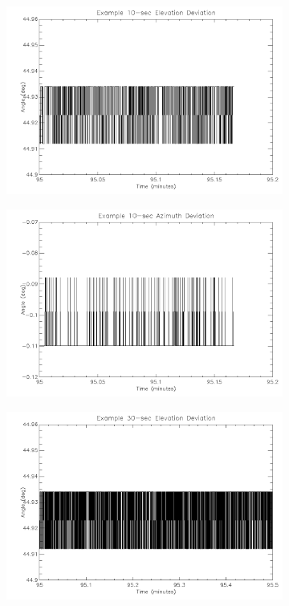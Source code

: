 \begin{figure}[htbp]
\begin{subfigure}{0.45\textwidth}
		\includegraphics[width=1\linewidth]{appendix/img/campaign_results/latealt10sec.png}
		\caption{}
		\label{fig:sub:latealt10}
	\end{subfigure}
	\begin{subfigure}{0.45\textwidth}
		\includegraphics[width=1\linewidth]{appendix/img/campaign_results/lateaz10sec.png}
		\caption{}
		\label{fig:sub:lateaz10}
	\end{subfigure}
	\begin{subfigure}{0.45\textwidth}
		\includegraphics[width=1\linewidth]{appendix/img/campaign_results/latealt30sec.png}

\end{subfigure}
\end{figure}
